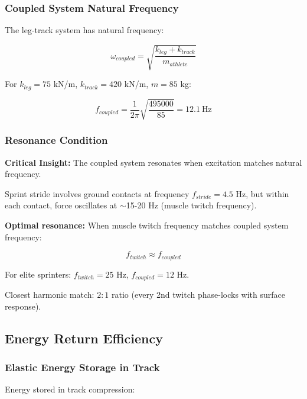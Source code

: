 \subsubsection{Coupled System Natural Frequency}

The leg-track system has natural frequency:

\begin{equation}
\omega_{coupled} = \sqrt{\frac{k_{leg} + k_{track}}{m_{athlete}}}
\label{eq:coupled_frequency}
\end{equation}

For $k_{leg} = 75$ kN/m, $k_{track} = 420$ kN/m, $m = 85$ kg:

\begin{equation}
f_{coupled} = \frac{1}{2\pi}\sqrt{\frac{495000}{85}} = 12.1~\text{Hz}
\label{eq:coupled_system_frequency}
\end{equation}

\subsubsection{Resonance Condition}

\textbf{Critical Insight:} The coupled system resonates when excitation matches natural frequency.

Sprint stride involves ground contacts at frequency $f_{stride} = 4.5$ Hz, but within each contact, force oscillates at $\sim$15-20 Hz (muscle twitch frequency).

\textbf{Optimal resonance:} When muscle twitch frequency matches coupled system frequency:

\begin{equation}
f_{twitch} \approx f_{coupled}
\label{eq:resonance_condition}
\end{equation}

For elite sprinters: $f_{twitch} = 25$ Hz, $f_{coupled} = 12$ Hz.

Closest harmonic match: $2:1$ ratio (every 2nd twitch phase-locks with surface response).

\subsection{Energy Return Efficiency}

\subsubsection{Elastic Energy Storage in Track}

Energy stored in track compression:

